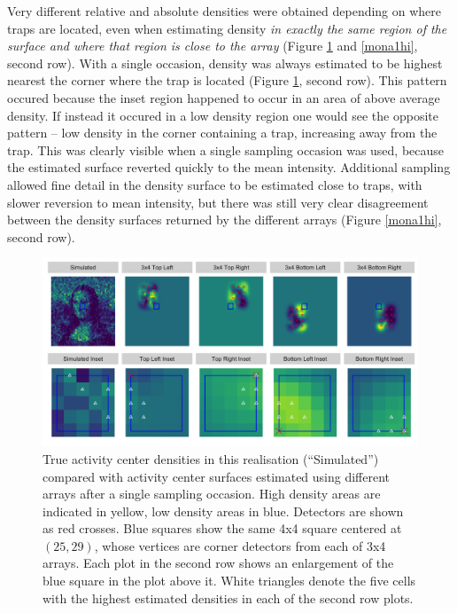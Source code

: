 \documentclass[a4paper,12pt]{article}
\begin{document}
Very different relative and absolute densities were obtained depending on where traps are located, even when estimating density {\it in exactly the same region of the surface and where that region is close to the array} (Figure \ref{mona1low} and \ref{mona1hi}, second row). With a single occasion, density was always estimated to be highest nearest the corner where the trap is located (Figure \ref{mona1low}, second row). This pattern occured because the inset region happened to occur in an area of above average density. If instead it occured in a low density region one would see the opposite pattern -- low density in the corner containing a trap, increasing away from the trap. This was clearly visible when a single sampling occasion was used, because the estimated surface reverted quickly to the mean intensity. Additional sampling allowed fine detail in the density surface to be estimated close to traps, with slower reversion to mean intensity, but there was still very clear disagreement between the density surfaces returned by the different arrays (Figure \ref{mona1hi}, second row).

\begin{figure}[htbp]
\centering
\includegraphics[width=1\textwidth]{many_faces_mona_loweffort}
\caption{True activity center densities in this realisation (``Simulated'') compared with activity center surfaces estimated using different arrays after a single sampling occasion. High density areas are indicated in yellow, low density areas in blue. Detectors are shown as red crosses. Blue squares show the same 4x4 square centered at $(25,29)$, whose vertices are corner detectors from each of 3x4 arrays. Each plot in the second row shows an enlargement of the blue square in the plot above it. White triangles denote the five cells with the highest estimated densities in each of the second row plots.}
\label{mona1low}
\end{figure}
\end{document}

